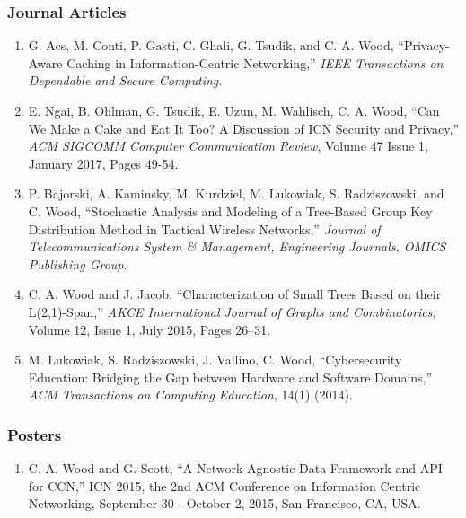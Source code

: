 \documentclass[10pt]{res} %
\begin{document}
\begin{resume}
\vspace{-15pt}
\subsubsection*{Journal Articles}

\begin{enumerate}[J-1.]

\item G. Acs, M. Conti, P. Gasti, C. Ghali, G. Tsudik, and C. A. Wood, ``Privacy-Aware Caching in Information-Centric Networking,'' \emph{IEEE Transactions on Dependable and Secure Computing}.

\item E. Ngai, B. Ohlman, G. Tsudik, E. Uzun, M. Wahlisch, C. A. Wood, ``Can We Make a Cake and Eat It Too? A Discussion of ICN Security and Privacy,'' \emph{ACM SIGCOMM Computer Communication Review}, Volume 47 Issue 1, January 2017, Pages 49-54.

\item P. Bajorski, A. Kaminsky, M. Kurdziel, M. Lukowiak, S. Radziszowski, and C. Wood, ``Stochastic Analysis and Modeling of a Tree-Based Group Key Distribution Method in Tactical Wireless Networks,'' \emph{Journal of Telecommunications System \& Management, Engineering Journals, OMICS Publishing Group}.

\item C. A. Wood and J. Jacob, ``Characterization of Small Trees Based on their L(2,1)-Span,'' \emph{AKCE International Journal of Graphs and Combinatorics}, Volume 12, Issue 1, July 2015, Pages 26–31.

\item M. Lukowiak, S. Radziszowski, J. Vallino, C. Wood, ``Cybersecurity Education: Bridging the Gap between Hardware and Software Domains,'' \emph{ACM Transactions on Computing Education}, 14(1) (2014).

\end{enumerate}

\vspace{-15pt}
\subsubsection*{Posters}
\begin{enumerate}[P-1.]
	\item C. A. Wood and G. Scott, ``A Network-Agnostic Data Framework and API for CCN,'' ICN 2015, the 2nd ACM Conference on Information Centric Networking, September 30 - October 2, 2015, San Francisco, CA, USA.


\end{enumerate}
\end{resume}
\end{document}
